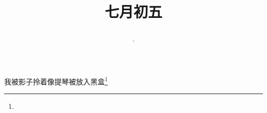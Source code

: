 \title{\date[d=8,m=8,y=2024][year:cn-y,年,month:cn,day:cn,日,·,weekday]·七月初五 }
我被影子拎着像提琴被放入黑盒\footnote{ }

